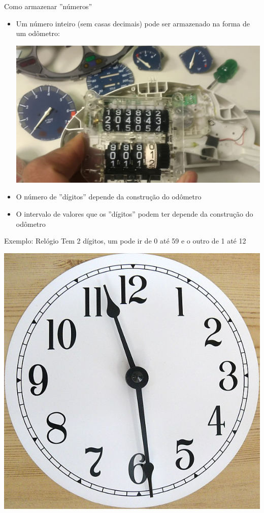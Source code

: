 \begin{frame}{Como armazenar ''números''}
    \begin{itemize}
        \item Um número inteiro (sem casas decimais) pode ser armazenado na forma de um odômetro:
            \begin{center}
                \includegraphics[height=0.5\textheight]{images/odometro.jpg}
            \end{center}
        \item O número de ''dígitos'' depende da construção do odômetro
        \item O intervalo de valores que os ''dígitos'' podem ter depende da construção do odômetro
    \end{itemize}
\end{frame}

\begin{frame}{Exemplo: Relógio}
        Tem 2 dígitos, um pode ir de 0 até 59 e o outro de 1 até 12

            \begin{center}
                \includegraphics[height=0.65\textheight]{images/clock.jpeg}
            \end{center}
\end{frame}

